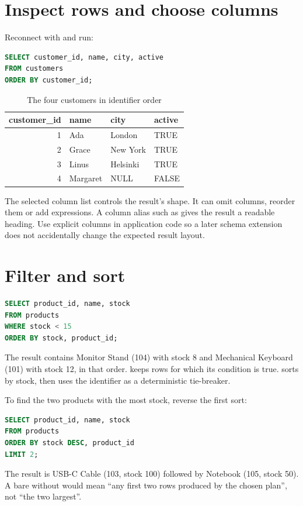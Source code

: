 
\section{Inspect rows and choose columns}
Reconnect with  and run:
\begin{lstlisting}[language=SQL]
SELECT customer_id, name, city, active
FROM customers
ORDER BY customer_id;
\end{lstlisting}
\begin{table}[htbp]\centering
\caption{The four customers in identifier order}
\begin{tabular}{r l l l}\toprule
customer\_id & name & city & active\\\midrule
1 & Ada & London & TRUE\\
2 & Grace & New York & TRUE\\
3 & Linus & Helsinki & TRUE\\
4 & Margaret & NULL & FALSE\\\bottomrule
\end{tabular}
\end{table}
The selected column list controls the result's shape. It can omit columns,
reorder them or add expressions. A column alias such as
 gives the result a readable heading.
Use explicit columns in application code so a later schema extension does
not accidentally change the expected result layout.

\section{Filter and sort}
\begin{lstlisting}[language=SQL]
SELECT product_id, name, stock
FROM products
WHERE stock < 15
ORDER BY stock, product_id;
\end{lstlisting}
The result contains Monitor Stand (104) with stock 8 and Mechanical Keyboard
(101) with stock 12, in that order.  keeps rows for which its
condition is true.  sorts by stock, then
uses the identifier as a deterministic tie-breaker.

To find the two products with the most stock, reverse the first sort:
\begin{lstlisting}[language=SQL]
SELECT product_id, name, stock
FROM products
ORDER BY stock DESC, product_id
LIMIT 2;
\end{lstlisting}
The result is USB-C Cable (103, stock 100) followed by Notebook (105, stock
50). A bare  without  would mean ``any first two
rows produced by the chosen plan'', not ``the two largest''.

